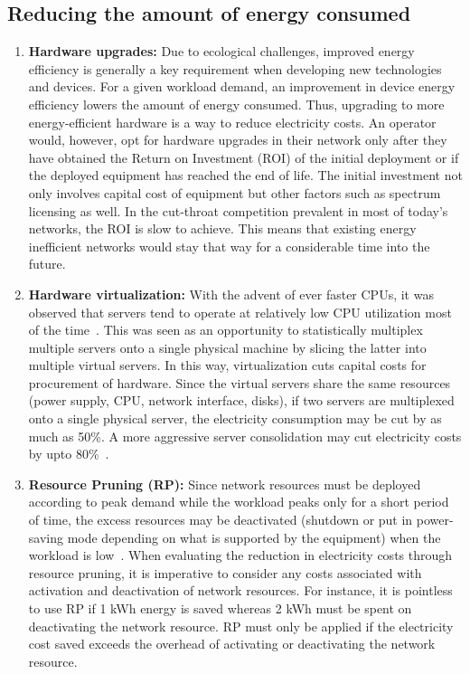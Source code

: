 \subsection{Reducing the amount of energy consumed}
\begin{enumerate}
\item \textbf{Hardware upgrades:} Due to ecological challenges, improved energy efficiency is generally a key requirement when developing new technologies and devices. For a given workload demand, an improvement in device energy efficiency lowers the amount of energy consumed. Thus, upgrading to more energy-efficient hardware is a way to reduce electricity costs. An operator would, however, opt for hardware upgrades in their network only after they have obtained the Return on Investment (ROI) of the initial deployment or if the deployed equipment has reached the end of life. The initial investment not only involves capital cost of equipment but other factors such as spectrum licensing as well. In the cut-throat competition prevalent in most of today's networks, the ROI is slow to achieve. This means that existing energy inefficient networks would stay that way for a considerable time into the future.
\item \textbf{Hardware virtualization:} With the advent of ever faster CPUs, it was observed that servers tend to operate at relatively low CPU utilization most of the time~\cite{Armbrust:2010:VCC:1721654.1721672}. This was seen as an opportunity to statistically multiplex multiple servers onto a single physical machine by slicing the latter into multiple virtual servers. In this way, virtualization cuts capital costs for procurement of hardware. Since the virtual servers share the same resources (power supply, CPU, network interface, disks), if two servers are multiplexed onto a single physical server, the electricity consumption may be cut by as much as 50\%. A more aggressive server consolidation may cut electricity costs by upto 80\%~\cite{VirtualizationCutsPower}.
\item \textbf{Resource Pruning (RP):} Since network resources must be deployed according to peak demand while the workload peaks only for a short period of time, the excess resources may be deactivated (shutdown or put in power-saving mode depending on what is supported by the equipment) when the workload is low~\cite{Chase:2001:MES:502059.502045,Chen:2008:ESP:1387589.1387613,Meisner:2009:PES:1508244.1508269,Lin_dynamicright-sizing,Peng:2011:BTSSaving:Mobicom}. When evaluating the reduction in electricity costs through resource pruning, it is imperative to consider any costs associated with activation and deactivation of network resources. For instance, it is pointless to use RP if 1 kWh energy is saved whereas 2 kWh must be spent on deactivating the network resource. RP must only be applied if the electricity cost saved exceeds the overhead of activating or deactivating the network resource.

\end{enumerate}
